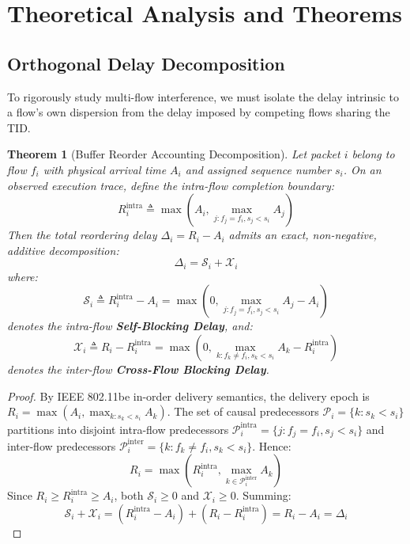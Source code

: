 \documentclass[10pt,journal,compsoc]{IEEEtran}
\newtheorem{theorem}{Theorem}
\begin{document}
\section{Theoretical Analysis and Theorems}
\label{sec:theory}

\subsection{Orthogonal Delay Decomposition}

To rigorously study multi-flow interference, we must isolate the delay intrinsic to a flow's own dispersion from the delay imposed by competing flows sharing the TID.

\begin{theorem}[Buffer Reorder Accounting Decomposition]
\label{thm:decomp}
Let packet $i$ belong to flow $f_i$ with physical arrival time $A_i$ and assigned sequence number $s_i$. On an observed execution trace, define the intra-flow completion boundary:
\begin{equation}
    R_i^{\text{intra}} \triangleq \max\left(A_i, \max_{j: f_j = f_i, s_j < s_i} A_j\right)
\end{equation}
Then the total reordering delay $\Delta_i = R_i - A_i$ admits an exact, non-negative, additive decomposition:
\begin{equation}
    \Delta_i = \mathcal{S}_i + \mathcal{X}_i
\end{equation}
where:
\begin{equation}
    \mathcal{S}_i \triangleq R_i^{\text{intra}} - A_i = \max\left(0, \max_{j: f_j = f_i, s_j < s_i} A_j - A_i\right)
\end{equation}
denotes the intra-flow \textbf{Self-Blocking Delay}, and:
\begin{equation}
    \mathcal{X}_i \triangleq R_i - R_i^{\text{intra}} = \max\left(0, \max_{k: f_k \ne f_i, s_k < s_i} A_k - R_i^{\text{intra}}\right)
\end{equation}
denotes the inter-flow \textbf{Cross-Flow Blocking Delay}.
\end{theorem}

\begin{proof}
By IEEE 802.11be in-order delivery semantics, the delivery epoch is $R_i = \max(A_i, \max_{k: s_k < s_i} A_k)$. The set of causal predecessors $\mathcal{P}_i = \{k : s_k < s_i\}$ partitions into disjoint intra-flow predecessors $\mathcal{P}_i^{\text{intra}} = \{j : f_j = f_i, s_j < s_i\}$ and inter-flow predecessors $\mathcal{P}_i^{\text{inter}} = \{k : f_k \ne f_i, s_k < s_i\}$. Hence:
\begin{equation}
    R_i = \max\left( R_i^{\text{intra}}, \max_{k \in \mathcal{P}_i^{\text{inter}}} A_k \right)
\end{equation}
Since $R_i \ge R_i^{\text{intra}} \ge A_i$, both $\mathcal{S}_i \ge 0$ and $\mathcal{X}_i \ge 0$. Summing:
\begin{equation}
    \mathcal{S}_i + \mathcal{X}_i = (R_i^{\text{intra}} - A_i) + (R_i - R_i^{\text{intra}}) = R_i - A_i = \Delta_i
\end{equation}
\end{proof}
\end{document}
